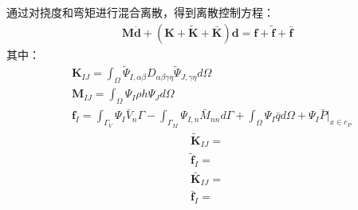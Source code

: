 \documentclass[a4paper]{article}
\begin{document}
通过对挠度和弯矩进行混合离散，得到离散控制方程：
\begin{equation}
\begin{split}
    \pmb{M}\ddot{\pmb d}+(\pmb{K}+\pmb{\tilde{K}}+\pmb{\bar{K}})\pmb{d}=\pmb{f}+\pmb{\tilde{f}}+\pmb{\bar f}
\end{split}
\end{equation}
其中：
\begin{equation}
\begin{split}
    &\pmb{K}_{I\!J}=\int_{\Omega}\tilde{\Psi}_{I,\alpha\beta}D_{\alpha\beta\gamma\eta}\tilde{\Psi}_{J,\gamma\eta}d\Omega\\
    &\pmb{M}_{I\!J}=\int_{\Omega}\Psi_I\rho h\Psi_Jd\Omega\\
    &\pmb{f}_I=\int_{\Gamma_V}\Psi_I\bar{V}_n\Gamma-\int_{\Gamma_M}\Psi_{I,n}\bar{M}_{nn}d\Gamma+\int_{\Omega}\Psi_I\bar{q}d\Omega+\Psi_I\bar{P}\vert_{x\in c_P}
\end{split}
\end{equation}
\begin{equation}
\begin{split}
   \pmb{\tilde{K}}_{I\!J}=\\
   \pmb{\tilde{f}}_I= 
\end{split}
\end{equation}
\begin{equation}
\begin{split}
     \pmb{\bar{K}}_{I\!J}=\\
     \pmb{\bar{f}}_I=
\end{split}
\end{equation}
\end{document}
